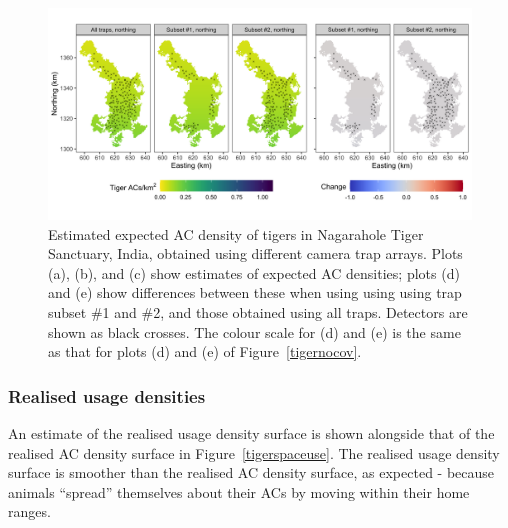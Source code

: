 \documentclass[10pt,a4paper]{article}
\begin{document}
\begin{figure}[htbp]
\centering
\includegraphics[width=1\textwidth]{tiger_surfaces_covs.png}
\caption{Estimated expected AC density of tigers in Nagarahole Tiger Sanctuary, India, obtained using different camera trap arrays. Plots (a), (b), and (c) show estimates of expected AC densities; plots (d) and (e) show differences between these when using using using trap subset \#1 and \#2, and those obtained using all traps. Detectors are shown as black crosses. The colour scale for (d) and (e) is the same as that for plots (d) and (e) of Figure~\ref{tigernocov}.}
\label{tigercov}
\end{figure}

\subsubsection{Realised usage densities}

An estimate of the realised usage density surface is shown alongside that of the realised AC density surface  in Figure~\ref{tigerspaceuse}. The realised usage density surface is smoother than the realised AC density surface, as expected - because animals ``spread'' themselves about their ACs by moving within their home ranges. %
\end{document}
